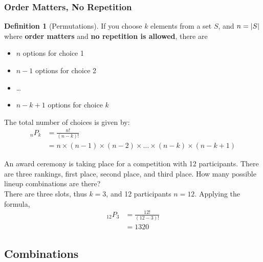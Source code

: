 \documentclass[12pt]{article}
\DeclarePairedDelimiter\abs{\lvert}{\rvert}
\theoremstyle{definition}
\newtheorem{definition}{Definition}
\begin{document}
    \subsubsection{Order Matters, No Repetition}
    \begin{definition}[Permutations]
        \label{def:permutation}
        If you choose $k$ elements from a set $S$, and $n = \abs{S}$ where \textbf{order matters} and \textbf{no repetition is allowed}, there are
        \begin{itemize}
            \item $n$ options for choice 1
            \item $n-1$ options for choice 2
            \item \dots
            \item $n-k+1$ options for choice $k$
        \end{itemize}
        The total number of choices is given by:
        \begin{align*}
            _nP_k &= \frac{n!}{(n-k)!}\\
            &= n \times (n-1) \times (n-2) \times \dots \times (n-k) \times (n-k+1)
        \end{align*}
    \end{definition}

    \begin{example}
        An award ceremony is taking place for a competition with 12 participants. There are three rankings, first place, second place, and third
        place. How many possible lineup combinations are there? \\

        There are three slots, thus $k = 3$, and 12 participants $n = 12$. Applying the formula,
        \begin{align*}
            _{12}P_3 &= \frac{12!}{(12-3)!} \\
            &= 1320
        \end{align*}
    \end{example}


    \subsection{Combinations}
\end{document}
